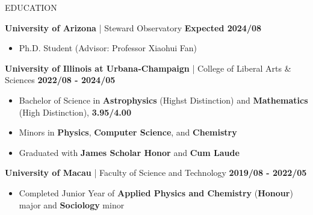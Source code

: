 \documentclass[11pt]{article} %
\begin{document}

\begin{section}{EDUCATION}

\textbf{University of Arizona} | Steward Observatory \hfill \textbf{Expected 2024/08}
\begin{itemize}[leftmargin=1.5em]
    \item Ph.D. Student (Advisor: Professor Xiaohui Fan)
\end{itemize}
\textbf{University of Illinois at Urbana-Champaign} | College of Liberal Arts \& Sciences \hfill \textbf{2022/08 - 2024/05}
\begin{itemize}[leftmargin=1.5em]
    \item Bachelor of Science in \textbf{Astrophysics} (Highst Distinction) and \textbf{Mathematics} (High Distinction), \textbf{3.95/4.00}
    \item Minors in \textbf{Physics}, \textbf{Computer Science}, and \textbf{Chemistry}
    \item Graduated with \textbf{James Scholar Honor} and \textbf{Cum Laude}
\end{itemize}
\textbf{University of Macau} | Faculty of Science and Technology \hfill \textbf{2019/08 - 2022/05}
\begin{itemize}[leftmargin=1.5em]
    \item Completed Junior Year of \textbf{Applied Physics and Chemistry} (\textbf{Honour}) major and \textbf{Sociology} minor %
\end{itemize}

\end{section}
\end{document}
